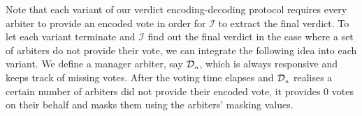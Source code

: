 Note that each variant of our verdict encoding-decoding protocol requires every arbiter to provide an encoded vote  in order for $\mathcal{I}$ to extract the final verdict. To let each variant terminate and $\mathcal{I}$ find out the final verdict in the case where a  set of  arbiters do not provide their vote, we can integrate the    following idea into each variant. We define a manager arbiter, say $\mathcal{D}_{\scriptscriptstyle n}$, which is always responsive and keeps track of missing votes. After the voting time elapses and $\mathcal{D}_{\scriptscriptstyle n}$ realises a certain  number of arbiters did not provide their encoded vote, it provides $0$ votes on their behalf and masks them using the  arbiters' masking values. 









